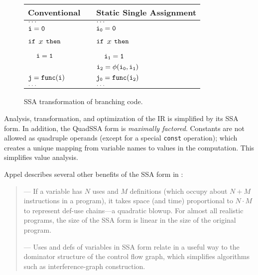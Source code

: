 \documentclass[11pt,notitlepage,twocolumn,twoside]{article}
\begin{document}
\begin{figure}[t]
\begin{tabular}{lll}
Conventional    && Static Single Assignment \\ \hline
$\tt \ldots$    && $\tt \ldots$ \\
$\tt i=0$       && $\tt i_0 = 0$ \\
$\tt if$ $x$ $\tt then$ && $\tt if$ $x$ $\tt then$ \\
~~$\tt i=1$     && ~~$\tt i_1 = 1$ \\
                && $\tt i_2 = \phi(i_0, i_1)$ \\
$\tt j=func(i)$ && $\tt j_0 = func(i_2)$ \\
$\tt \ldots$    && $\tt \ldots$ \\
\end{tabular}
\caption{SSA transformation of branching code.}
\label{fig:ssa2}
\end{figure}

Analysis, transformation, and optimization of the
IR is simplified by its SSA form.
In addition, the QuadSSA form is \textit{maximally factored}.
Constants are not allowed as quadruple operands (except for a special
\texttt{const} operation); which creates a unique mapping from
variable names to values in the computation.  This simplifies value
analysis.

Appel describes several other benefits of the SSA form in \cite{appel:modern}:

\begin{quote}
---%
If a variable has $N$ uses and $M$ definitions (which occupy
about $N+M$ instructions in a program), it takes space (and time)
proportional to $N\cdot M$ to represent def-use chains---a quadratic
blowup.  For almost all realistic programs, the size of the SSA form
is linear in the size of the original program.

---%
Uses and defs of variables in SSA form relate in a useful way to
the dominator structure of the control flow graph, which simplifies
algorithms such as interference-graph construction.
\end{quote}
\end{document}
